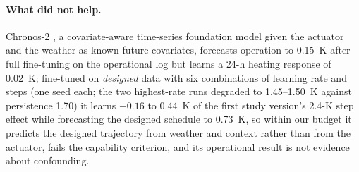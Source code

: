 \documentclass[11pt]{article}
\begin{document}
\paragraph{What did not help.} Chronos-2 \citep{chronos2}, a covariate-aware time-series foundation model given the actuator and the weather as known future covariates, forecasts operation to 0.15~K after full fine-tuning on the operational log but learns a 24-h heating response of 0.02~K; fine-tuned on \emph{designed} data with six combinations of learning rate and steps (one seed each; the two highest-rate runs degraded to 1.45--1.50~K against persistence 1.70) it learns $-0.16$ to 0.44~K of the first study version's 2.4-K step effect while forecasting the designed schedule to 0.73~K, so within our budget it predicts the designed trajectory from weather and context rather than from the actuator, fails the capability criterion, and its operational result is not evidence about confounding.



\end{document}
